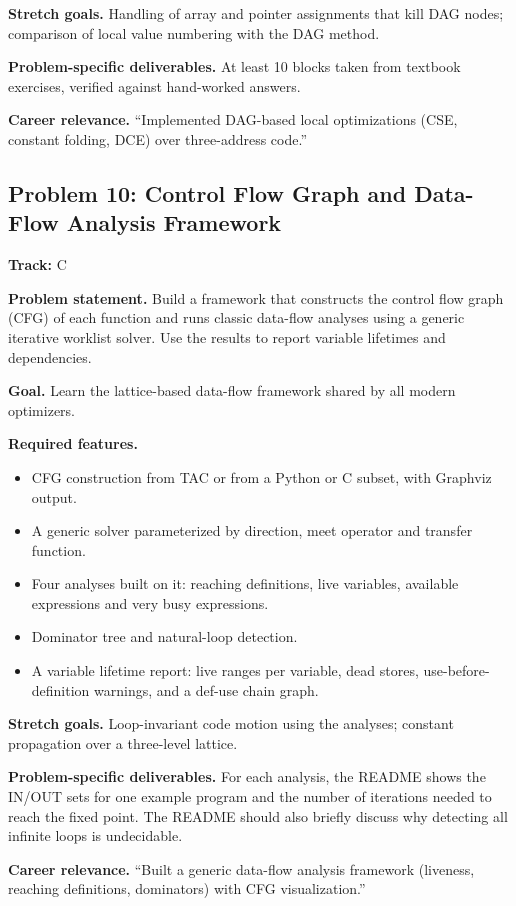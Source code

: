 \documentclass[11pt,a4paper]{article}
\newcommand{\fld}[1]{\par\smallskip\textbf{\color{accent}#1}\quad}
\newcommand{\meta}[1]{%
  \begin{tcolorbox}[colback=softbg,colframe=softbg,boxsep=2pt,left=4pt,right=4pt,top=2pt,bottom=2pt,arc=2pt]
  \small\textbf{Track:} #1
  \end{tcolorbox}}
\begin{document}
\fld{Stretch goals.} Handling of array and pointer assignments that kill DAG nodes; comparison of
local value numbering with the DAG method.

\fld{Problem-specific deliverables.} At least 10 blocks taken from textbook exercises, verified against hand-worked answers.

\fld{Career relevance.} ``Implemented DAG-based local optimizations (CSE, constant folding, DCE) over three-address code.''

\subsection{Problem 10: Control Flow Graph and Data-Flow Analysis Framework}
\meta{C}

\fld{Problem statement.} Build a framework that constructs the control flow graph (CFG) of each
function and runs classic data-flow analyses using a generic iterative worklist solver. Use the
results to report variable lifetimes and dependencies.

\fld{Goal.} Learn the lattice-based data-flow framework shared by all modern optimizers.

\fld{Required features.}
\begin{itemize}
  \item CFG construction from TAC or from a Python or C subset, with Graphviz output.
  \item A generic solver parameterized by direction, meet operator and transfer function.
  \item Four analyses built on it: reaching definitions, live variables, available expressions and very busy expressions.
  \item Dominator tree and natural-loop detection.
  \item A variable lifetime report: live ranges per variable, dead stores, use-before-definition warnings, and a def-use chain graph.
\end{itemize}

\fld{Stretch goals.} Loop-invariant code motion using the analyses; constant propagation over a three-level lattice.

\fld{Problem-specific deliverables.} For each analysis, the README shows the IN/OUT sets for one
example program and the number of iterations needed to reach the fixed point. The README should also
briefly discuss why detecting all infinite loops is undecidable.

\fld{Career relevance.} ``Built a generic data-flow analysis framework (liveness, reaching definitions, dominators) with CFG visualization.''
\end{document}
